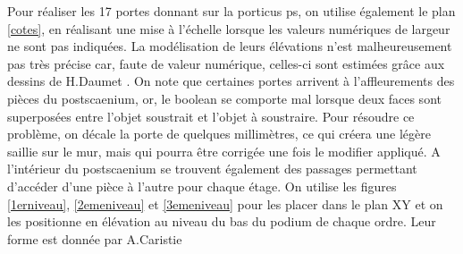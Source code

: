 Pour réaliser les 17 portes donnant sur la \gls{porticus ps}, on utilise également le plan \ref{cotes}, en réalisant une mise à l'échelle lorsque les valeurs numériques de largeur ne sont pas indiquées. La modélisation de leurs élévations n'est malheureusement pas très précise car, faute de valeur numérique, celles-ci sont estimées grâce aux dessins de H.Daumet \cite[Pl. XII, XIII, XIV]{orangePl}. On note que certaines portes arrivent à l'affleurements des pièces du \gls{postscaenium}, or, le \gls{boolean} se comporte mal lorsque deux faces sont superposées entre l'objet soustrait et l'objet à soustraire. Pour résoudre ce problème, on décale la porte de quelques millimètres, ce qui créera une légère saillie sur le mur, mais qui pourra être corrigée une fois le modifier appliqué. A l'intérieur du \gls{postscaenium} se trouvent également des passages permettant d'accéder d'une pièce à l'autre pour chaque étage. On utilise les figures \ref{1erniveau}, \ref{2emeniveau} et \ref{3emeniveau} pour les placer dans le plan XY et on les positionne en élévation au niveau du bas du \gls{podium} de chaque ordre. Leur forme est donnée par A.Caristie \cite[Pl. II]{orangePl}

